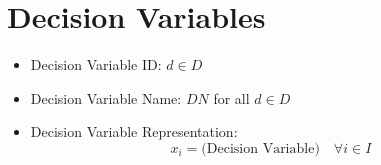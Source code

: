 \documentclass{article}
\begin{document}
\section{Decision Variables}
\begin{itemize}
    \item Decision Variable ID: $d \in D$
    \item Decision Variable Name: $DN$ for all $d \in D$
    \item Decision Variable Representation:
    \[
        x_i = \text{(Decision Variable)} \quad \forall i \in I
    \]
\end{itemize}
\end{document}
